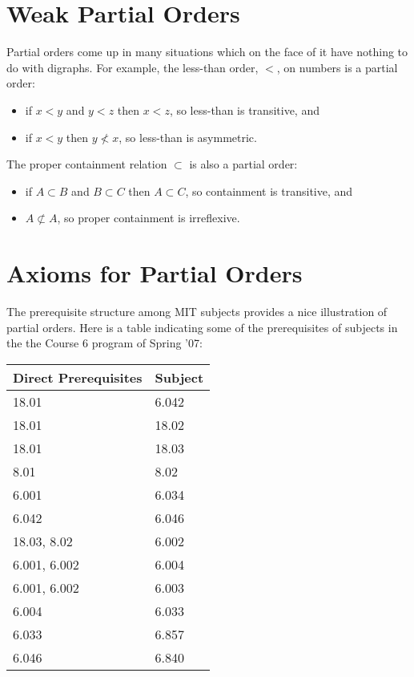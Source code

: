 \begin{definition}
\section{Weak Partial Orders}\label{partial_order_sec}
Partial orders come up in many situations which on the face of it have
nothing to do with digraphs.  For example, the less-than order, $<$, on
numbers is a partial order:
\begin{itemize}
\item if $x <y$ and $y < z$ then $x < z$, so less-than is transitive, and
\item  if $x <y$ then $y \not < x$, so less-than is asymmetric.
\end{itemize}
 The proper containment relation $\subset$ is also a
partial order:
\begin{itemize}
\item if $A \subset B$ and $B \subset C$ then $A \subset C$,
so containment is transitive, and
\item  $A \not\subset A$, so proper containment is irreflexive.
\end{itemize}


\iffalse
, but so is the containment relation on sets
and the divisibility relation on integers.
\fi

\iffalse

\section{Axioms for Partial Orders}

The prerequisite structure among MIT subjects provides a nice illustration
of partial orders.  Here is a table indicating some of the prerequisites of
subjects in the the Course 6 program of Spring '07:
\begin{center}
\begin{tabular}{|l|l|}
\hline
Direct Prerequisites & Subject\\ \hline
18.01 & 6.042\\ \hline
 18.01 & 18.02\\ \hline
 18.01 & 18.03\\ \hline
 8.01 & 8.02\\ \hline
 6.001 & 6.034\\ \hline
 6.042 & 6.046\\ \hline
 18.03, 8.02 & 6.002\\ \hline
 6.001, 6.002 & 6.004\\ \hline
 6.001, 6.002 & 6.003\\ \hline
 6.004 & 6.033\\ \hline
 6.033 & 6.857\\ \hline
 6.046 & 6.840\\ \hline
\end{tabular}
\end{center}


\end{definition}
